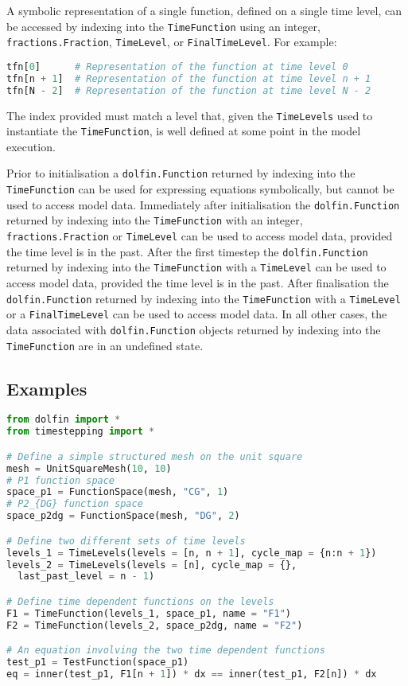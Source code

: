 \documentclass[a4paper]{book}
\begin{document}
A symbolic representation of a single function, defined on a single time level,
can be accessed by indexing into the \verb+TimeFunction+ using an integer,
\verb+fractions.Fraction+, \verb+TimeLevel+, or \verb+FinalTimeLevel+. For
example:
\begin{lstlisting}[language = python, frame = single, basicstyle=\footnotesize]
tfn[0]      # Representation of the function at time level 0
tfn[n + 1]  # Representation of the function at time level n + 1
tfn[N - 2]  # Representation of the function at time level N - 2
\end{lstlisting}
The index provided must match a level that, given the \verb+TimeLevels+ used to
instantiate the \verb+TimeFunction+, is well defined at some point in the model
execution.

Prior to initialisation a \verb+dolfin.Function+ returned by indexing into the
\verb+TimeFunction+ can be used for expressing equations symbolically, but
cannot be used to access model data. Immediately after initialisation the
\linebreak \verb+dolfin.Function+ returned by indexing into the
\verb+TimeFunction+ with an integer, \verb+fractions.Fraction+ or
\verb+TimeLevel+ can be used to access model data, provided the time level is in
the past. After the first timestep the \verb+dolfin.Function+ returned by
indexing into the \verb+TimeFunction+ with a \verb+TimeLevel+ can be used to
access model data, provided the time level is in the past. After finalisation
the \verb+dolfin.Function+ returned by indexing into the \verb+TimeFunction+
with a \verb+TimeLevel+ or a \verb+FinalTimeLevel+ can be used to access model
data. In all other cases, the data associated with \verb+dolfin.Function+
objects returned by indexing into the \verb+TimeFunction+ are in an undefined
state.

\subsection*{Examples}

\begin{lstlisting}[language = python, frame = single, basicstyle=\footnotesize]
from dolfin import *
from timestepping import *

# Define a simple structured mesh on the unit square
mesh = UnitSquareMesh(10, 10)
# P1 function space
space_p1 = FunctionSpace(mesh, "CG", 1)
# P2_{DG} function space
space_p2dg = FunctionSpace(mesh, "DG", 2)

# Define two different sets of time levels
levels_1 = TimeLevels(levels = [n, n + 1], cycle_map = {n:n + 1})
levels_2 = TimeLevels(levels = [n], cycle_map = {},
  last_past_level = n - 1)

# Define time dependent functions on the levels
F1 = TimeFunction(levels_1, space_p1, name = "F1")
F2 = TimeFunction(levels_2, space_p2dg, name = "F2")

# An equation involving the two time dependent functions
test_p1 = TestFunction(space_p1)
eq = inner(test_p1, F1[n + 1]) * dx == inner(test_p1, F2[n]) * dx
\end{lstlisting}
\end{document}
